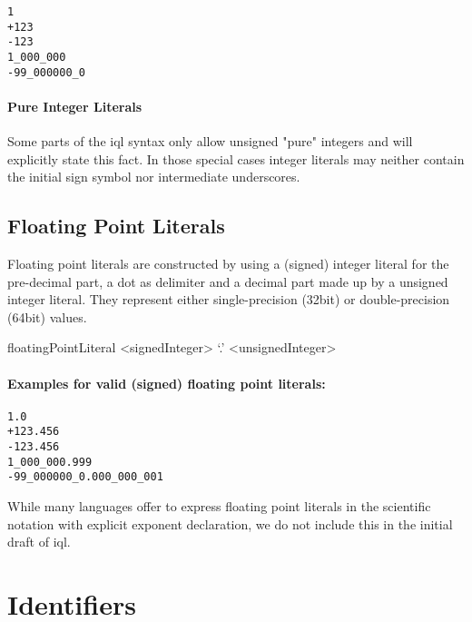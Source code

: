 \documentclass[11pt,a4paper]{report}
\begin{document}
\begin{Verbatim}[samepage=true]
1
+123
-123
1_000_000
-99_000000_0
\end{Verbatim}

\paragraph{Pure Integer Literals}
Some parts of the \ac{iql} syntax only allow unsigned "pure" integers and will explicitly state this fact. In those special cases integer literals may neither contain the initial sign symbol nor intermediate underscores.

\subsection{Floating Point Literals}
\label{sec:floating-point-literals}

Floating point literals are constructed by using a (signed) integer literal for the pre-decimal part, a dot  as delimiter and a decimal part made up by a unsigned integer literal. They represent either single-precision  (32bit) or double-precision  (64bit) values.

\begin{gram}
	\label{gram:floating-point}
	\begin{rrdiag*}{floatingPointLiteral}
		<signedInteger> `.' <unsignedInteger>
	\end{rrdiag*}
\end{gram}

\paragraph{Examples for valid (signed) floating point literals:}

\begin{Verbatim}[samepage=true]
1.0
+123.456
-123.456
1_000_000.999
-99_000000_0.000_000_001
\end{Verbatim}

\noindent While many languages offer to express floating point literals in the scientific notation with explicit exponent declaration, we do not include this in the initial draft of \ac{iql}.

\section{Identifiers}
\label{sec:identifiers}
\end{document}
